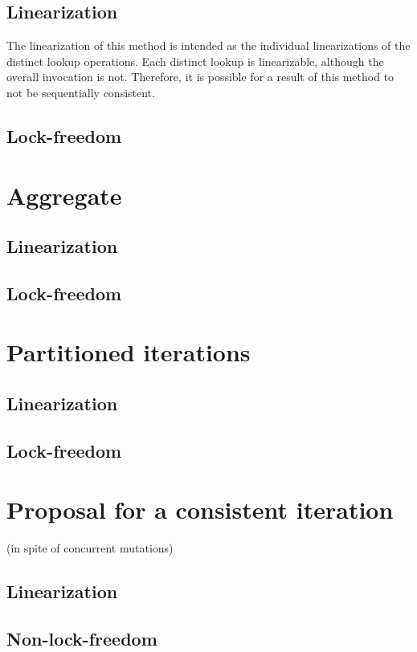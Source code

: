 \subsection{Linearization}

The linearization of this method is intended as the individual linearizations of the distinct lookup operations.
Each distinct lookup is linearizable, although the overall invocation is not.
Therefore, it is possible for a result of this method to not be sequentially consistent.


\subsection{Lock-freedom}

\section{Aggregate}
\subsection{Linearization}
\subsection{Lock-freedom}

\section{Partitioned iterations}
\subsection{Linearization}
\subsection{Lock-freedom}

\section{Proposal for a consistent iteration}

(in spite of concurrent mutations)

\subsection{Linearization}
\subsection{Non-lock-freedom}
